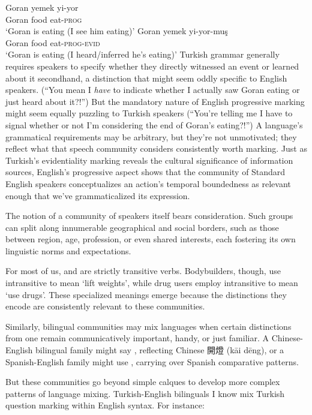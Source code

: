 \ea
\ea \gll Goran yemek yi-yor\\
Goran food eat-\textsc{prog}\\
\glt `Goran is eating (I see him eating)'
\ex \gll Goran yemek yi-yor-muş\\
Goran food eat-\textsc{prog}-\textsc{evid}\\
\glt `Goran is eating (I heard/inferred he's eating)'
\z\z
Turkish grammar generally requires speakers to specify whether they directly witnessed an event or learned about it secondhand, a distinction that might seem oddly specific to English speakers. (\enquote{You mean I \emph{have} to indicate whether I actually saw Goran eating or just heard about it?!}) But the mandatory nature of English progressive marking might seem equally puzzling to Turkish speakers (\enquote{You're telling me I have to signal whether or not I'm considering the end of Goran's eating?!}) A language's grammatical requirements may be arbitrary, but they're not unmotivated; they reflect what that speech community considers consistently worth marking. Just as Turkish's evidentiality marking reveals the cultural significance of information sources, English's progressive aspect shows that the community of Standard English speakers conceptualizes an action's temporal boundedness as relevant enough that we've grammaticalized its expression.

The notion of a community of speakers itself bears consideration. Such groups can split along innumerable geographical and social borders, such as those between region, age, profession, or even shared interests, each fostering its own linguistic norms and expectations.

For most of us,  and  are strictly transitive verbs. Bodybuilders, though, use intransitive  to mean `lift weights', while drug users employ intransitive  to mean `use drugs'. These specialized meanings emerge because the distinctions they encode are consistently relevant to these communities. 

Similarly, bilingual communities may mix languages when certain distinctions from one remain communicatively important, handy, or just familiar. A Chinese-English bilingual family might say , reflecting Chinese 開燈 (kāi dēng), or a Spanish-English family might use , carrying over Spanish comparative patterns.

But these communities go beyond simple calques to develop more complex patterns of language mixing. Turkish-English bilinguals I know mix Turkish question marking within English syntax. For instance:

